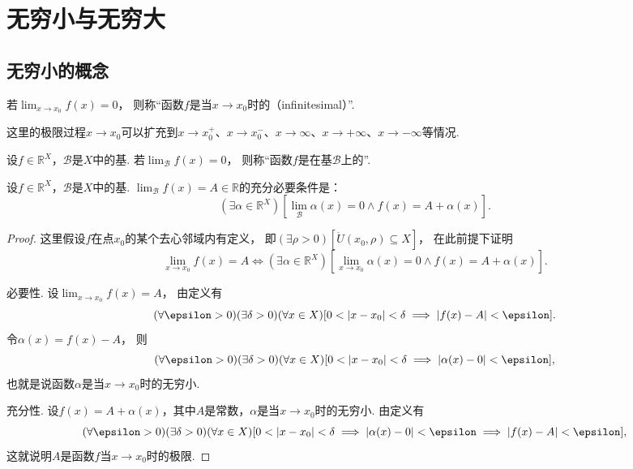\section{无穷小与无穷大}
\subsection{无穷小的概念}
\begin{definition}
若\(\lim_{x \to x_0} f(x) = 0\)，
则称“函数\(f\)是当\(x \to x_0\)时的（infinitesimal）”.
\end{definition}
这里的极限过程\(x \to x_0\)可以扩充到\(x \to x_0^+\)、\(x \to x_0^-\)、\(x \to \infty\)、\(x \to +\infty\)、\(x \to -\infty\)等情况.

\begin{definition}
设\(f\in\mathbb{R}^X\)，\(\mathcal{B}\)是\(X\)中的基.
若\(\lim_\mathcal{B} f(x) = 0\)，
则称“函数\(f\)是在基\(\mathcal{B}\)上的”.
\end{definition}

\begin{theorem}
设\(f\in\mathbb{R}^X\)，\(\mathcal{B}\)是\(X\)中的基.
\(\lim_\mathcal{B} f(x) = A \in \mathbb{R}\)的充分必要条件是：\begin{equation*}
	(\exists\alpha\in\mathbb{R}^X)
	\left[
		\lim_\mathcal{B} \alpha(x) = 0
		\land
		f(x) = A + \alpha(x)
	\right].
\end{equation*}
\begin{proof}
这里假设\(f\)在点\(x_0\)的某个去心邻域内有定义，
即\((\exists\rho>0)[\mathring{U}(x_0,\rho) \subseteq X]\)，
在此前提下证明\begin{equation*}
	\lim_{x \to x_0} f(x) = A
	\iff
	(\exists\alpha\in\mathbb{R}^X)
	\left[
		\lim_{x \to x_0} \alpha(x) = 0
		\land
		f(x) = A + \alpha(x)
	\right].
\end{equation*}

必要性.
设\(\lim_{x \to x_0} f(x) = A\)，
由定义有\begin{equation*}
	(\forall\epsilon>0)
	(\exists\delta>0)
	(\forall x\in X)
	[
		0<\abs{x-x_0}<\delta
		\implies
		\abs{f(x)-A}<\epsilon
	].
\end{equation*}
令\(\alpha(x)=f(x)-A\)，
则\begin{equation*}
	(\forall\epsilon>0)
	(\exists\delta>0)
	(\forall x\in X)
	[
		0<\abs{x-x_0}<\delta
		\implies
		\abs{\alpha(x)-0}<\epsilon
	],
\end{equation*}
也就是说函数\(\alpha\)是当\(x \to x_0\)时的无穷小.

充分性.
设\(f(x)=A+\alpha(x)\)，其中\(A\)是常数，\(\alpha\)是当\(x \to x_0\)时的无穷小.
由定义有\begin{equation*}
	(\forall\epsilon>0)
	(\exists\delta>0)
	(\forall x\in X)
	[
		0<\abs{x-x_0}<\delta
		\implies
		\abs{\alpha(x)-0}<\epsilon
		\implies
		\abs{f(x)-A}<\epsilon
	],
\end{equation*}
这就说明\(A\)是函数\(f\)当\(x \to x_0\)时的极限.
\end{proof}
\end{theorem}

